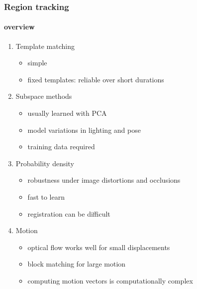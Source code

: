 \begin{frame}
\frametitle{Region tracking}
\framesubtitle{overview}
\logoCSIPCPL\mypagenum
	\begin{enumerate}
		\item Template matching
			\begin{itemize}
				\item simple
				\item fixed templates: reliable over short durations 
			\end{itemize}
		\item Subspace methods
			\begin{itemize}
				\item usually learned with PCA
				\item model variations in lighting and pose
				\item training data required
			\end{itemize}			
		\item Probability density
			\begin{itemize}
				\item robustness under image distortions and occlusions
				\item fast to learn
				\item registration can be difficult
			\end{itemize}
		\item Motion
			\begin{itemize}
				\item optical flow works well for small displacements
				\item block matching for large motion
				\item computing motion vectors is computationally complex
			\end{itemize}
	\end{enumerate}
\end{frame}




